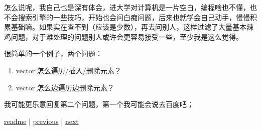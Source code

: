 怎么说呢，我自己也是深有体会，进大学对计算机是一片空白，编程啥也不懂，也不会搜索引擎的一些技巧，开始也会问白痴问题，后来也就学会自己动手，慢慢积累基础嘛。如果实在查不到（应该是少数），再去问别人，这样过滤了大量基本辣鸡问题，对于难处理的问题别人或许会更容易接受一些，至少我是这么觉得。

很简单的一个例子，两个问题：

\begin{enumerate}
\item vector 怎么遍历/插入/删除元素？
\item vector 怎么边遍历边删除元素？
\end{enumerate}

我可能更乐意回复第二个问题，第一个我可能会说去百度吧；

\noindent \href{https://github.com/taseikyo/arts}{readme} | \hyperref[chap:w3]{previous} | \hyperref[chap:w5]{next}
